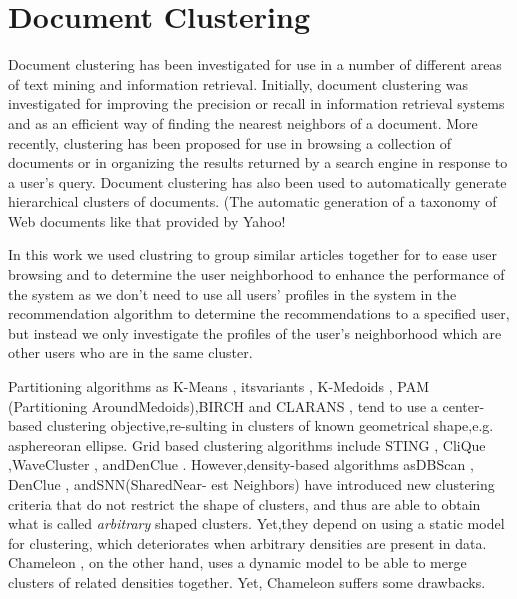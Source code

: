 
\chapter{Document Clustering} %

\label{clustering} %


Document clustering has been investigated for use in a number of different areas of text
mining and information retrieval. Initially, document clustering was investigated for improving
the precision or recall in information retrieval systems and as an efficient way of
finding the nearest neighbors of a document. More recently, clustering has been
proposed for use in browsing a collection of documents or in organizing the results
returned by a search engine in response to a user's query. Document clustering has
also been used to automatically generate hierarchical clusters of documents. (The
automatic generation of a taxonomy of Web documents like that provided by Yahoo! \citep{clustering_15}

In this work we used clustring to group similar articles together for to ease user browsing and to determine the user neighborhood to enhance the performance of the system as we don't need to use all users' profiles in the system in the recommendation algorithm to determine the recommendations to a specified user, but instead we only investigate the profiles of the user's neighborhood which are other users who are in the same cluster.

Partitioning algorithms as K-Means \citep{clustering_1}, itsvariants \citep{clustering_2} \citep{clustering_3}, K-Medoids \citep{clustering_4}, PAM \citep{clustering_5} (Partitioning AroundMedoids),BIRCH \citep{clustering_6} and
CLARANS \citep{clustering_7}, tend to use a center-based clustering objective,re-sulting in clusters of known geometrical shape,e.g. asphereoran ellipse. Grid based clustering algorithms include STING \citep{clustering_8}, CliQue \citep{clustering_9},WaveCluster \citep{clustering_10}, andDenClue \citep{clustering_11}.
However,density-based
algorithms asDBScan \citep{clustering_12}, DenClue \citep{clustering_11}, andSNN(SharedNear-
est Neighbors) \citep{clustering_13} have introduced new clustering criteria that do not restrict the shape of clusters, and thus are able to obtain what is called \textit{arbitrary} shaped clusters.
Yet,they depend on using a static model for clustering, which deteriorates when arbitrary densities are present in data. Chameleon  \citep{clustering_14}, on the
other hand, uses a dynamic model to be able to merge clusters of related densities together. Yet, Chameleon suffers some drawbacks.


